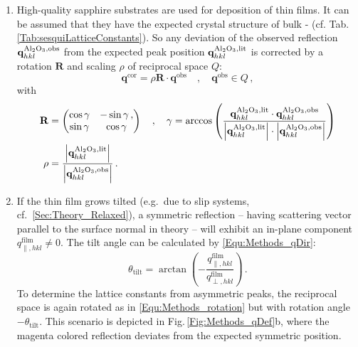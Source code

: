 \begin{enumerate}
    \item High-quality sapphire substrates are used for deposition of thin films.
    It can be assumed that they have the expected crystal structure of bulk \textalpha- (cf. Tab.\,\ref{Tab:sesquiLatticeConstants}).
    So any deviation of the observed reflection $\mathbf{q}_{hkl}^\mathrm{\ce{Al2O3},obs}$ from the expected peak position $\mathbf{q}_{hkl}^\mathrm{\ce{Al2O3},lit}$ is corrected by a rotation $\mathbf{R}$ and scaling $\rho$ of reciprocal space $Q$:
    \begin{equation}
        \mathbf{q}^\mathrm{cor}=\rho\mathbf{R}\cdot\mathbf{q}^\mathrm{obs}\quad,\quad\mathbf{q}^\mathrm{obs}\in Q\,,
    \end{equation}
    with
    \begin{align}
        \label{Equ:Methods_rotation}
        \mathbf{R}&=\begin{pmatrix}
            \cos\gamma&-\sin\gamma\,,\\
            \sin\gamma&\cos\gamma
        \end{pmatrix}\quad,\quad
        \gamma=\arccos\left(
            \frac
                {\mathbf{q}_{hkl}^\mathrm{\ce{Al2O3},lit}
                    \cdot\mathbf{q}_{hkl}^\mathrm{\ce{Al2O3},obs}}
                {\left|\mathbf{q}_{hkl}^\mathrm{\ce{Al2O3},lit}\right|
                    \cdot\left|\mathbf{q}_{hkl}^\mathrm{\ce{Al2O3},obs}\right|}
            \right)\\
        \rho&=\frac{\left|\mathbf{q}_{hkl}^\mathrm{\ce{Al2O3},lit}\right|}{\left|\mathbf{q}_{hkl}^\mathrm{\ce{Al2O3},obs}\right|}\,.
    \end{align}

    \item If the thin film grows tilted (e.g.\ due to slip systems, cf.~\ref{Sec:Theory_Relaxed}), a symmetric reflection -- having scattering vector parallel to the surface normal in theory -- will exhibit an in-plane component $q_{\parallel,hkl}^\mathrm{film}\neq0$.
    The tilt angle can be calculated by \eqref{Equ:Methods_qDir}: 
    \begin{equation}
        \theta_\mathrm{tilt}=\arctan\left(-\frac{q_{\parallel,hkl}^\mathrm{film}}{q_{\perp,hkl}^\mathrm{film}}\right)\,.
    \end{equation}
    To determine the lattice constants from asymmetric peaks, the reciprocal space is again rotated as in \ref{Equ:Methods_rotation} but with rotation angle $-\theta_\mathrm{tilt}$.
    This scenario is depicted in Fig.\,\ref{Fig:Methods_qDef}b, where the magenta colored reflection deviates from the expected symmetric position.


\end{enumerate}
